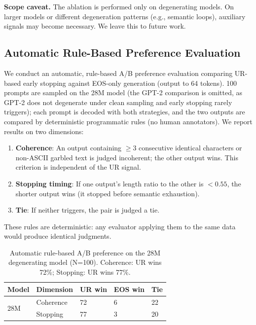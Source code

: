 \documentclass[11pt]{article}
\begin{document}
\textbf{Scope caveat.} The ablation is performed only on degenerating models. On larger models or different degeneration patterns (e.g., semantic loops), auxiliary signals may become necessary. We leave this to future work.

\subsection{Automatic Rule-Based Preference Evaluation}

We conduct an automatic, rule-based A/B preference evaluation comparing UR-based early stopping against EOS-only generation (output to 64 tokens). 100 prompts are sampled on the 28M model (the GPT-2 comparison is omitted, as GPT-2 does not degenerate under clean sampling and early stopping rarely triggers); each prompt is decoded with both strategies, and the two outputs are compared by deterministic programmatic rules (no human annotators). We report results on two dimensions: 

\begin{enumerate}
    \item \textbf{Coherence}: An output containing $\geq 3$ consecutive identical characters or non-ASCII garbled text is judged incoherent; the other output wins. This criterion is independent of the UR signal.
    \item \textbf{Stopping timing}: If one output's length ratio to the other is $< 0.55$, the shorter output wins (it stopped before semantic exhaustion).
    \item \textbf{Tie}: If neither triggers, the pair is judged a tie.
\end{enumerate}

These rules are deterministic: any evaluator applying them to the same data would produce identical judgments.

\begin{table}[t]
\centering
\caption{Automatic rule-based A/B preference on the 28M degenerating model (N=100). Coherence: UR wins 72\%; Stopping: UR wins 77\%.}
\label{tab:human-eval}
\begin{tabular}{lllll}
\toprule
\textbf{Model} & \textbf{Dimension} & \textbf{UR win} & \textbf{EOS win} & \textbf{Tie} \\
\midrule
\multirow{2}{*}{28M} & Coherence & 72 & 6 & 22 \\
& Stopping & 77 & 3 & 20 \\
\bottomrule
\end{tabular}
\end{table}
\end{document}
